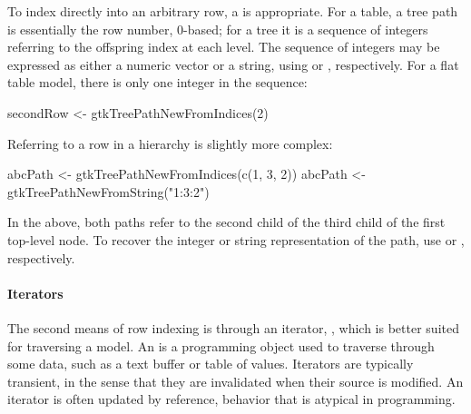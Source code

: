To index directly into an arbitrary row, a  is
appropriate. For a table, a tree path is essentially the row number,
$0$-based; for a tree it is a sequence of integers referring to the
offspring index at each level. The sequence of integers may be
expressed as either a numeric vector or a string, using
 or
, respectively. For a flat table
model, there is only one integer in the sequence:
\begin{Schunk}
\begin{Sinput}
 secondRow <- gtkTreePathNewFromIndices(2)
\end{Sinput}
\end{Schunk}
%
Referring to a row in a hierarchy is slightly more complex:
\begin{Schunk}
\begin{Sinput}
 abcPath <- gtkTreePathNewFromIndices(c(1, 3, 2))
 abcPath <- gtkTreePathNewFromString("1:3:2")
\end{Sinput}
\end{Schunk}
%
In the above, both paths refer to the second child of the third child
of the first top-level node. To recover the integer or string
representation of the path, use  or
, respectively.

\paragraph{Iterators}
The second means of row indexing is through an iterator,
, which is better suited for traversing a model.
An  is a programming object used to traverse through
some data, such as a text buffer or table of values. Iterators are
typically transient, in the sense that they are invalidated when their
source is modified. An iterator is often updated by reference,
behavior that is atypical in \R\/ programming. 



